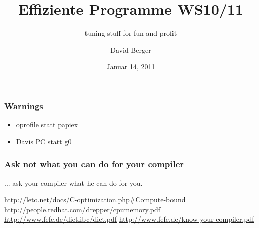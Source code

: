 \documentclass{beamer}
\title[EP1011]{Effiziente Programme WS10/11}
\subtitle[Tuning]{tuning stuff for fun and profit}
\author{David Berger}
\date[Januar 2011]{Januar 14, 2011}
\begin{document}
\begin{frame}
    \titlepage
\end{frame}

\begin{frame}
    \frametitle{Warnings}
    \begin{itemize}
        \item oprofile statt papiex
        \item Davis PC statt g0
    \end{itemize}
\end{frame}

\begin{frame}
    \frametitle{Ask not what you can do for your compiler}
    \begin{center} ... ask your compiler what he can do for you.
    \end{center}
\end{frame}

\begin{frame}
    \url{http://leto.net/docs/C-optimization.php\#Compute-bound}
    \url{http://people.redhat.com/drepper/cpumemory.pdf}
    \url{http://www.fefe.de/dietlibc/diet.pdf}
    \url{http://www.fefe.de/know-your-compiler.pdf}
\end{frame}
\end{document}
